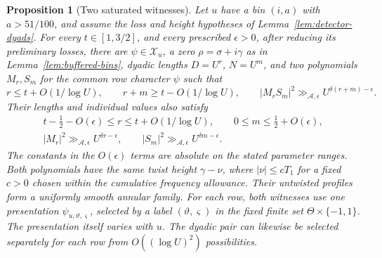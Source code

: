 \documentclass[11pt,a4paper]{article}
\numberwithin{equation}{section}
\numberwithin{figure}{section}
\newtheorem{proposition}[theorem]{Proposition}
\theoremstyle{definition}
\theoremstyle{remark}
\begin{document}
\begin{proposition}[Two saturated witnesses]\label{prop:detector-witness}
Let \(u\) have a bin \((i,a)\) with \(a>51/100\), and assume the
loss and height hypotheses of Lemma~\ref{lem:detector-dyads}.
For every \(t\in[1,3/2]\),
and every prescribed \(\epsilon>0\),
after reducing its preliminary losses, there are
\(\psi\in\mathcal X_u\), a zero \(\rho=\sigma+i\gamma\) as in
Lemma~\ref{lem:buffered-bins}, dyadic lengths \(D=U^r\), \(N=U^m\),
and two polynomials \(M_r,S_m\) for the common row character
\(\psi\) such that
\begin{equation}\label{eq:detector-note}
 r\le t+O(1/\log U),\qquad
 r+m\ge t-O(1/\log U),\qquad
 |M_rS_m|^2\gg_{\mathcal A,\epsilon}
 U^{\delta(r+m)-\epsilon}.
\end{equation}
Their lengths and individual values also satisfy
\begin{equation}\label{eq:saturated-witness}
 \begin{gathered}
 t-\tfrac12-O(\epsilon)\le r\le t+O(1/\log U),
 \qquad 0\le m\le\tfrac12+O(\epsilon),\\
 |M_r|^2\gg_{\mathcal A,\epsilon}U^{\delta r-\epsilon},
 \qquad
 |S_m|^2\gg_{\mathcal A,\epsilon}U^{\delta m-\epsilon}.
 \end{gathered}
\end{equation}
The constants in the \(O(\epsilon)\) terms are absolute on the
stated parameter ranges.  Both polynomials have the same twist
height \(\gamma-\nu\), where \(|\nu|\le cT_1\) for a fixed
\(c>0\) chosen within the cumulative frequency allowance.
Their untwisted profiles form a uniformly smooth annular family.
For each row, both witnesses use one presentation
\(\psi_{u,\vartheta,\varsigma}\), selected by a label
\((\vartheta,\varsigma)\) in the fixed finite set
\(\Theta\times\{-1,1\}\).  The presentation itself varies with \(u\).
The dyadic pair can likewise
be selected separately for each row from \(O((\log U)^2)\) possibilities.
\end{proposition}
\end{document}
